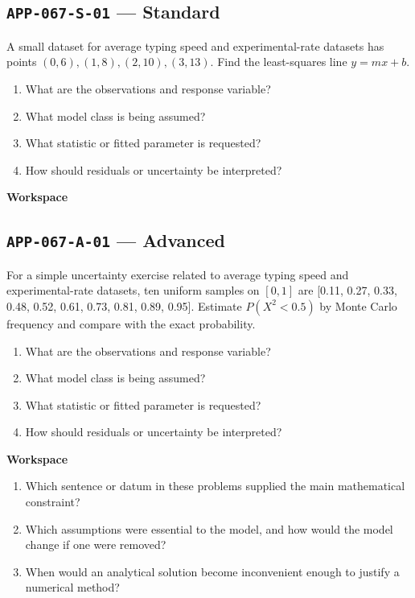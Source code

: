 \documentclass[11pt]{book}
\newcommand{\pid}[1]{\texttt{#1}}
\newcommand{\workspace}{\par\vspace{0.7in}\hrulefill\par\vspace{0.55in}\hrulefill\par}
\begin{document}
\subsection*{\pid{APP-067-S-01} — Standard}
\begin{problembox}
A small dataset for average typing speed and experimental-rate datasets has points $(0,6),(1,8),(2,10),(3,13)$. Find the least-squares line $y=mx+b$.
\end{problembox}
\begin{promptbox}\begin{enumerate}
\item What are the observations and response variable?
\item What model class is being assumed?
\item What statistic or fitted parameter is requested?
\item How should residuals or uncertainty be interpreted?
\end{enumerate}\end{promptbox}
\textbf{Workspace}\workspace
{}
\subsection*{\pid{APP-067-A-01} — Advanced}
\begin{problembox}
For a simple uncertainty exercise related to average typing speed and experimental-rate datasets, ten uniform samples on $[0,1]$ are [0.11, 0.27, 0.33, 0.48, 0.52, 0.61, 0.73, 0.81, 0.89, 0.95]. Estimate $P(X^2<0.5)$ by Monte Carlo frequency and compare with the exact probability.
\end{problembox}
\begin{promptbox}\begin{enumerate}
\item What are the observations and response variable?
\item What model class is being assumed?
\item What statistic or fitted parameter is requested?
\item How should residuals or uncertainty be interpreted?
\end{enumerate}\end{promptbox}
\textbf{Workspace}\workspace
\begin{reflectionbox}\begin{enumerate}
\item Which sentence or datum in these problems supplied the main mathematical constraint?
\item Which assumptions were essential to the model, and how would the model change if one were removed?
\item When would an analytical solution become inconvenient enough to justify a numerical method?
\end{enumerate}\end{reflectionbox}
\end{document}
